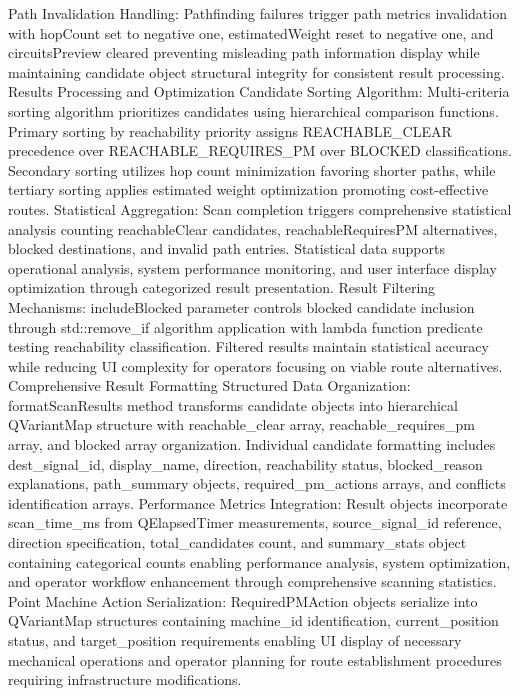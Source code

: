 Path Invalidation Handling: Pathfinding failures trigger path metrics invalidation with hopCount set to negative one, estimatedWeight reset to negative one, and circuitsPreview cleared preventing misleading path information display while maintaining candidate object structural integrity for consistent result processing.
Results Processing and Optimization
Candidate Sorting Algorithm: Multi-criteria sorting algorithm prioritizes candidates using hierarchical comparison functions. Primary sorting by reachability priority assigns REACHABLE_CLEAR precedence over REACHABLE_REQUIRES_PM over BLOCKED classifications. Secondary sorting utilizes hop count minimization favoring shorter paths, while tertiary sorting applies estimated weight optimization promoting cost-effective routes.
Statistical Aggregation: Scan completion triggers comprehensive statistical analysis counting reachableClear candidates, reachableRequiresPM alternatives, blocked destinations, and invalid path entries. Statistical data supports operational analysis, system performance monitoring, and user interface display optimization through categorized result presentation.
Result Filtering Mechanisms: includeBlocked parameter controls blocked candidate inclusion through std::remove_if algorithm application with lambda function predicate testing reachability classification. Filtered results maintain statistical accuracy while reducing UI complexity for operators focusing on viable route alternatives.
Comprehensive Result Formatting
Structured Data Organization: formatScanResults method transforms candidate objects into hierarchical QVariantMap structure with reachable_clear array, reachable_requires_pm array, and blocked array organization. Individual candidate formatting includes dest_signal_id, display_name, direction, reachability status, blocked_reason explanations, path_summary objects, required_pm_actions arrays, and conflicts identification arrays.
Performance Metrics Integration: Result objects incorporate scan_time_ms from QElapsedTimer measurements, source_signal_id reference, direction specification, total_candidates count, and summary_stats object containing categorical counts enabling performance analysis, system optimization, and operator workflow enhancement through comprehensive scanning statistics.
Point Machine Action Serialization: RequiredPMAction objects serialize into QVariantMap structures containing machine_id identification, current_position status, and target_position requirements enabling UI display of necessary mechanical operations and operator planning for route establishment procedures requiring infrastructure modifications.

